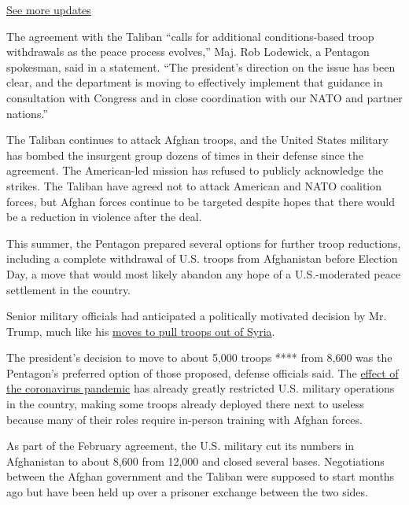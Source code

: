\href{https://www.nytimes3xbfgragh.onion/2020/08/04/us/elections/primary-election-michigan-arizona-kansas.html?action=click\&pgtype=Article\&state=default\&region=MAIN_CONTENT_1\&context=storylines_live_updates}{See
more updates}

The agreement with the Taliban ``calls for additional conditions-based
troop withdrawals as the peace process evolves,'' Maj. Rob Lodewick, a
Pentagon spokesman, said in a statement. ``The president's direction on
the issue has been clear, and the department is moving to effectively
implement that guidance in consultation with Congress and in close
coordination with our NATO and partner nations.''

The Taliban continues to attack Afghan troops, and the United States
military has bombed the insurgent group dozens of times in their defense
since the agreement. The American-led mission has refused to publicly
acknowledge the strikes. The Taliban have agreed not to attack American
and NATO coalition forces, but Afghan forces continue to be targeted
despite hopes that there would be a reduction in violence after the
deal.

This summer, the Pentagon prepared several options for further troop
reductions, including a complete withdrawal of U.S. troops from
Afghanistan before Election Day, a move that would most likely abandon
any hope of a U.S.-moderated peace settlement in the country.

Senior military officials had anticipated a politically motivated
decision by Mr. Trump, much like his
\href{https://www.nytimes3xbfgragh.onion/2018/12/20/world/middleeast/winners-losers-syria-trumps-troops.html}{moves
to pull troops out of Syria}.

The president's decision to move to about 5,000 troops **** from 8,600
was the Pentagon's preferred option of those proposed, defense officials
said. The
\href{https://www.nytimes3xbfgragh.onion/2020/07/21/us/politics/coronavirus-military.html}{effect
of the coronavirus pandemic} has already greatly restricted U.S.
military operations in the country, making some troops already deployed
there next to useless because many of their roles require in-person
training with Afghan forces.

As part of the February agreement, the U.S. military cut its numbers in
Afghanistan to about 8,600 from 12,000 and closed several bases.
Negotiations between the Afghan government and the Taliban were supposed
to start months ago but have been held up over a prisoner exchange
between the two sides.

